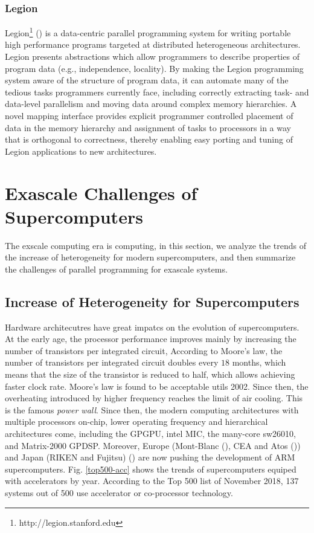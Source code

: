 \subsubsection{Legion}

Legion\footnote{http://legion.stanford.edu} (\cite{grimshaw1994synopsis}) is a data-centric parallel programming system for writing portable high performance programs targeted at distributed heterogeneous architectures. Legion presents abstractions which allow programmers to describe properties of program data (e.g., independence, locality). By making the Legion programming system aware of the structure of program data, it can automate many of the tedious tasks programmers currently face, including correctly extracting task- and data-level parallelism and moving data around complex memory hierarchies. A novel mapping interface provides explicit programmer controlled placement of data in the memory hierarchy and assignment of tasks to processors in a way that is orthogonal to correctness, thereby enabling easy porting and tuning of Legion applications to new architectures.


\section{Exascale Challenges of Supercomputers}\label{Exascale Challenges of Supercomputers}

The exscale computing era is computing, in this section, we analyze the trends of the increase of heterogeneity for modern supercomputers, and then summarize the challenges of parallel programming for exascale systems.

\subsection{Increase of Heterogeneity for Supercomputers} \label{Trends of Heterogeneity}

Hardware architecutres have great impatcs on the evolution of supercomputers. At the early age, the processor performance improves mainly by increasing the number of transistors per integrated circuit, According to Moore's law, the number of transistors per integrated circuit doubles every $18$ months, which means that the size of the transistor is reduced to half, which allows achieving faster clock rate. Moore's law is found to be acceptable utils 2002. Since then, the overheating introduced by higher frequency reaches the limit of air cooling. This is the famous \textit{power wall}. Since then, the modern computing architectures with multiple processors on-chip, lower operating frequency and hierarchical architectures come, including the GPGPU, intel MIC, the many-core sw26010, and Matrix-2000 GPDSP. Moreover, Europe (Mont-Blanc (\cite{rajovic2016mont}), CEA and Atos (\cite{ceaarm})) and Japan (RIKEN and Fujitsu) (\cite{japanarm}) are now pushing the development of ARM supercomputers. Fig. \ref{top500-acc} shows the trends of supercomputers equiped with accelerators by year. According to the Top 500 list of November 2018, 137 systems out of 500 use accelerator or co-processor technology.

